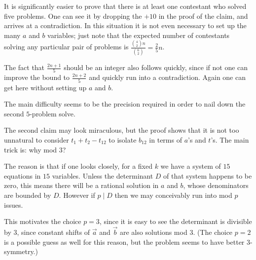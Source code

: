 \begin{remark*}
  It is significantly easier to prove that there
  is at least one contestant who solved five problems.
  One can see it by dropping the $+10$ in the proof of the claim,
  and arrives at a contradiction.
  In this situation it is not even necessary to set up
  the many $a$ and $b$ variables;
  just note that the expected number of contestants
  solving any particular pair of problems is
  $\frac{\binom42n}{\binom62} = \frac25n$.

  The fact that $\frac{2n+1}{5}$
  should be an integer also follows quickly,
  since if not one can improve the bound to $\frac{2n+2}{5}$
  and quickly run into a contradiction.
  Again one can get here without setting up $a$ and $b$.

  The main difficulty seems to be the precision required
  in order to nail down the second $5$-problem solve.
\end{remark*}

\begin{remark*}
  The second claim may look miraculous,
  but the proof shows that it is not too unnatural
  to consider $t_1 + t_2 - t_{12}$ to isolate $b_{12}$
  in terms of $a$'s and $t$'s.
  The main trick is: why mod $3$?

  The reason is that if one looks closely, for a
  fixed $k$ we have a system of $15$ equations in $15$ variables.
  Unless the determinant $D$ of that system happens to be zero,
  this means there will be a rational solution in $a$ and $b$,
  whose denominators are bounded by $D$.
  However if $p \mid D$ then we may conceivably run into mod $p$
  issues.

  This motivates the choice $p = 3$,
  since it is easy to see the determinant is divisible by $3$,
  since constant shifts of $\vec a$ and $\vec b$ are also solutions mod $3$.
  (The choice $p = 2$ is a possible guess as well for this reason,
  but the problem seems to have better $3$-symmetry.)
\end{remark*}
\pagebreak




